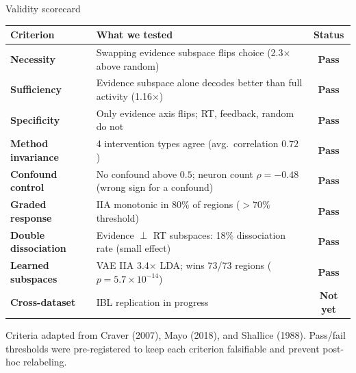 \documentclass[aspectratio=169,11pt]{beamer}
\begin{document}
\begin{frame}{Validity scorecard}
\vspace{-0.5em}
{\scriptsize
\begin{tabular}{lp{7cm}c}
\toprule
\textbf{Criterion} & \textbf{What we tested} & \textbf{Status} \\
\midrule
\textbf{Necessity} & Swapping evidence subspace flips choice (2.3$\times$ above random) & \textcolor{pass}{\textbf{Pass}} \\
\textbf{Sufficiency} & Evidence subspace alone decodes better than full activity (1.16$\times$) & \textcolor{pass}{\textbf{Pass}} \\
\textbf{Specificity} & Only evidence axis flips; RT, feedback, random do not & \textcolor{pass}{\textbf{Pass}} \\
\textbf{Method invariance} & 4 intervention types agree (avg.\ correlation $0.72$) & \textcolor{pass}{\textbf{Pass}} \\
\textbf{Confound control} & No confound above $0.5$; neuron count $\rho = -0.48$ (wrong sign for a confound) & \textcolor{pass}{\textbf{Pass}} \\
\textbf{Graded response} & IIA monotonic in 80\% of regions ($> 70\%$ threshold) & \textcolor{pass}{\textbf{Pass}} \\
\textbf{Double dissociation} & Evidence $\perp$ RT subspaces: 18\% dissociation rate (small effect) & \textcolor{pass}{\textbf{Pass}} \\
\textbf{Learned subspaces} & VAE IIA 3.4$\times$ LDA; wins 73/73 regions ($p = 5.7 \times 10^{-14}$) & \textcolor{pass}{\textbf{Pass}} \\
\textbf{Cross-dataset} & IBL replication in progress & \textcolor{fail}{\textbf{Not yet}} \\
\bottomrule
\end{tabular}
}

\vspace{0.6em}
{\small Criteria adapted from Craver (2007), Mayo (2018), and Shallice (1988). Pass/fail thresholds were pre-registered to keep each criterion falsifiable and prevent post-hoc relabeling.}
\end{frame}

\end{document}
